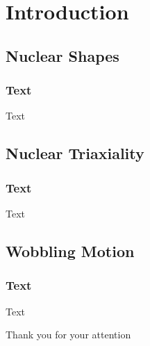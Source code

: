 \documentclass{beamer}
\begin{document}
\section{Introduction}


\subsection{Nuclear Shapes}
\begin{frame}
    \frametitle{Text}
    Text
\end{frame}
\subsection{Nuclear Triaxiality}
\begin{frame}
    \frametitle{Text}
    Text
\end{frame}
\subsection{Wobbling Motion}
\begin{frame}
    \frametitle{Text}
    Text
\end{frame}

\begin{frame}[plain] %
	\begin{center}
		\bigskip\bigskip %
		{\Huge Thank you for your attention \faHeart}
	\end{center}
\end{frame}
\end{document}
